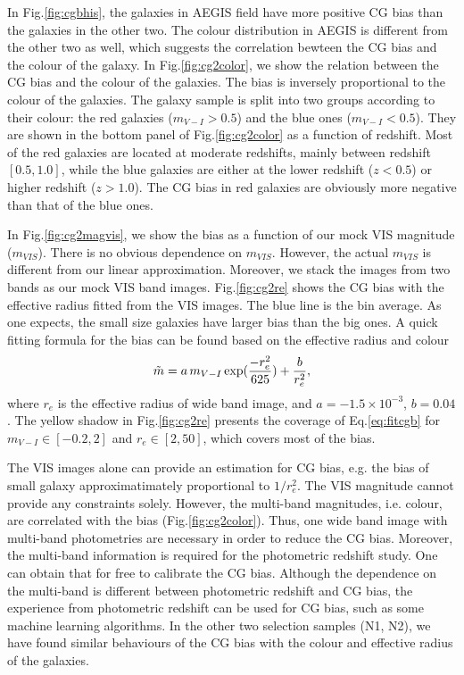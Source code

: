 \documentclass[useAMS,usenatbib]{mn2e}
\newcommand{\be}{\begin{equation}}
\newcommand{\ee}{\end{equation}}
\def\elabel#1{\label{eq:#1}}
\begin{document}
In Fig.\ref{fig:cgbhis}, the galaxies in AEGIS field have more
positive CG bias than the galaxies in the other two. The colour
distribution in AEGIS is different from the other two as well, which
suggests the correlation bewteen the CG bias and the colour of the
galaxy. In Fig.\ref{fig:cg2color}, we show the relation between the
CG bias and the colour of the galaxies. The bias is inversely
proportional to the colour of the galaxies. The galaxy sample is split
into two groups according to their colour: the red galaxies
($m_{V-I}>0.5$) and the blue ones ($m_{V-I}<0.5$). They are shown
in the bottom panel of Fig.\ref{fig:cg2color} as a function of
redshift. Most of the red galaxies are located at moderate redshifts,
mainly between redshift $[0.5,1.0]$, while the blue galaxies are
either at the lower redshift ($z<0.5$) or higher redshift
($z>1.0$). The CG bias in red galaxies are obviously more negative
than that of the blue ones.

In Fig.\ref{fig:cg2magvis}, we show the bias as a function of our mock VIS
magnitude ($m_{VIS}$). There is no obvious dependence on $m_{VIS}$. However,
the actual $m_{VIS}$ is different from our linear approximation.
Moreover, we stack the images from two bands as our mock VIS band images.
Fig.\ref{fig:cg2re} shows the CG bias with the effective radius fitted
from the VIS images. The blue line is the bin average. As one
expects, the small size galaxies have larger bias than the big
ones. A quick fitting formula for the bias can be found based on the
effective radius and colour
%
\be
\tilde{m} = a\, m_{V-I}\,{\rm exp}({-r_e^2 \over 625}) +{b \over r_e^2},
\elabel{fitcgb}
\ee
%
where $r_e$ is the effective radius of wide band image, and
$a=-1.5\times 10^{-3}$, $b=0.04$. The yellow shadow in
Fig.\ref{fig:cg2re} presents the coverage of Eq.\ref{eq:fitcgb} for
$m_{V-I}\in [-0.2,2]$ and $r_e\in [2,50]$, which covers most of the
bias.

The VIS images alone can provide an estimation for CG bias, e.g. the
bias of small galaxy approximatimately proportional to $1/r_e^2$. The
VIS magnitude cannot provide any constraints solely. However, the multi-band
magnitudes, i.e. colour, are correlated with the bias
(Fig.\ref{fig:cg2color}). Thus, one wide band image with multi-band
photometries are necessary in order to reduce the CG bias. Moreover, the
multi-band information is required for the photometric redshift
study. One can obtain that for free to calibrate the CG bias. Although
the dependence on the multi-band is different between photometric
redshift and CG bias, the experience from photometric redshift can be
used for CG bias, such as some machine learning algorithms. In the other two
selection samples (N1, N2), we have found similar behaviours of the CG bias
with the colour and effective radius of the galaxies.
\end{document}
